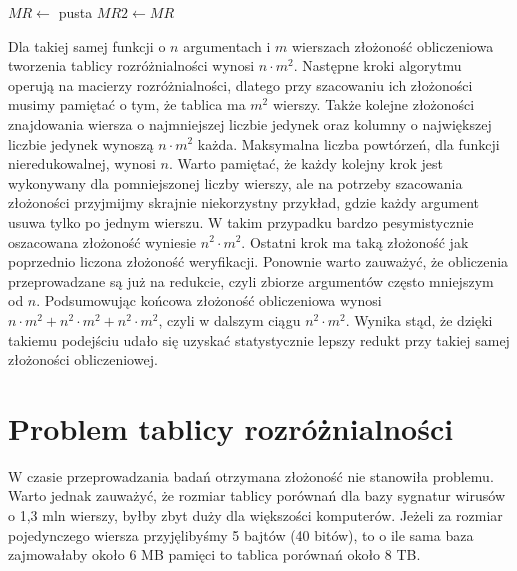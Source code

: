 \begin{algorithm}[H]
    $MR\gets$ pusta\;
    $MR2\gets MR$\;
\end{algorithm}

Dla takiej samej funkcji o $n$ argumentach i $m$ wierszach złożoność obliczeniowa tworzenia tablicy rozróżnialności wynosi $n \cdot m^2$.
Następne kroki algorytmu operują na macierzy rozróżnialności,
dlatego przy szacowaniu ich złożoności musimy pamiętać o tym,
że tablica ma $m^2$ wierszy.
Także kolejne złożoności znajdowania wiersza o najmniejszej liczbie jedynek oraz kolumny o największej liczbie jedynek wynoszą $n \cdot m^2$ każda.
Maksymalna liczba powtórzeń,
dla funkcji nieredukowalnej,
wynosi $n$.
Warto pamiętać,
że każdy kolejny krok jest wykonywany dla pomniejszonej liczby wierszy,
ale na potrzeby szacowania złożoności przyjmijmy skrajnie niekorzystny przykład,
gdzie każdy argument usuwa tylko po jednym wierszu.
W takim przypadku bardzo pesymistycznie oszacowana złożoność wyniesie $n^2 \cdot m^2$.
Ostatni krok ma taką złożoność jak poprzednio liczona złożoność weryfikacji.
Ponownie warto zauważyć,
że obliczenia przeprowadzane są już na redukcie,
czyli zbiorze argumentów często mniejszym od $n$.
Podsumowując końcowa złożoność obliczeniowa wynosi $n \cdot m^2 + n^2 \cdot m^2 + n^2 \cdot m^2$,
czyli w dalszym ciągu $n^2 \cdot m^2$.
Wynika stąd,
że dzięki takiemu podejściu udało się uzyskać statystycznie lepszy redukt przy takiej samej złożoności obliczeniowej.


\section{Problem tablicy rozróżnialności}

W czasie przeprowadzania badań otrzymana złożoność nie stanowiła problemu.
Warto jednak zauważyć,
że rozmiar tablicy porównań dla bazy sygnatur wirusów o 1,3 mln wierszy,
byłby zbyt duży dla większości komputerów.
Jeżeli za rozmiar pojedynczego wiersza przyjęlibyśmy 5 bajtów (40 bitów), to o ile sama baza zajmowałaby około 6 MB pamięci to tablica porównań około 8 TB.

